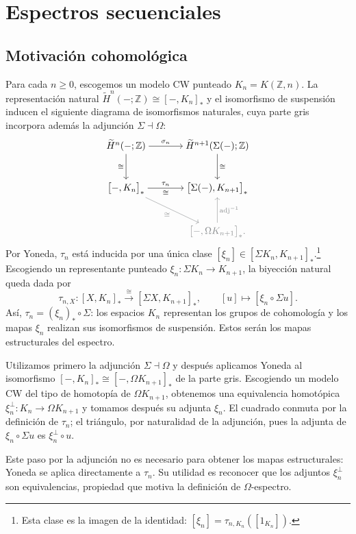 \section{Espectros secuenciales}
\subsection{Motivación cohomológica}

Para cada $n\ge0$, escogemos un modelo CW punteado $K_n=K(\mathbb Z,n)$. La representación natural $\widetilde H^n(-;\mathbb Z)\cong[-,K_n]_*$ y el isomorfismo de suspensión inducen el siguiente diagrama de isomorfismos naturales, cuya parte gris incorpora además la adjunción $\Sigma\dashv\Omega$:
\[
\begin{tikzcd}[column sep=large,row sep=large,cramped]
\widetilde H^n(-;\mathbb Z)
    \arrow[r,"\sigma_n"] \arrow[d,"\cong"']
& \widetilde H^{n+1}(\Sigma(-);\mathbb Z) \arrow[d,"\cong"]\\
\bigl[-,K_n\bigr]_*
    \arrow[r,"\tau_n","\cong"']
    \arrow[dr,"\cong"',grisCIMAT]
& \bigl[\Sigma(-),K_{n+1}\bigr]_*\\
& \color{grisCIMAT}\bigl[-,\Omega K_{n+1}\bigr]_*
    \arrow[u,"\operatorname{adj}^{-1}"',grisCIMAT].
\end{tikzcd}
\]
Por Yoneda, $\tau_n$ está inducida por una única clase $[\xi_n]\in[\Sigma K_n,K_{n+1}]_*$.\footnote{Esta clase es la imagen de la identidad: $[\xi_n]=\tau_{n,K_n}([1_{K_n}])$.} Escogiendo un representante punteado $\xi_n\colon\Sigma K_n\to K_{n+1}$, la biyección natural queda dada por
\[
\tau_{n,X}\colon[X,K_n]_*\xrightarrow{\ \cong\ }[\Sigma X,K_{n+1}]_*,
\qquad
[u]\longmapsto[\xi_n\circ\Sigma u].
\]
Así, $\tau_n=(\xi_n)_*\circ\Sigma$: los espacios $K_n$ representan los grupos de cohomología y los mapas $\xi_n$ realizan sus isomorfismos de suspensión. Estos serán los mapas estructurales del espectro.

\begin{nota}
Utilizamos primero la adjunción $\Sigma\dashv\Omega$ y después aplicamos Yoneda al isomorfismo $[-,K_n]_*\cong[-,\Omega K_{n+1}]_*$ de la parte gris. Escogiendo un modelo CW del tipo de homotopía de $\Omega K_{n+1}$, obtenemos una equivalencia homotópica $\xi_n^\perp\colon K_n\to\Omega K_{n+1}$ y tomamos después su adjunta $\xi_n$. El cuadrado conmuta por la definición de $\tau_n$; el triángulo, por naturalidad de la adjunción, pues la adjunta de $\xi_n\circ\Sigma u$ es $\xi_n^\perp\circ u$.

Este paso por la adjunción no es necesario para obtener los mapas estructurales: Yoneda se aplica directamente a $\tau_n$. Su utilidad es reconocer que los adjuntos $\xi_n^\perp$ son equivalencias, propiedad que motiva la definición de $\Omega$-espectro.
\end{nota}

